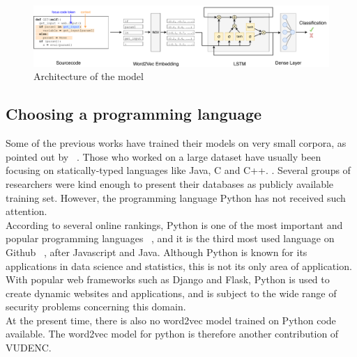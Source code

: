 \documentclass[
	a4paper,
	pagesize,
	pdftex,
	12pt,
	twoside, %
	BCOR=5mm, %
	ngerman,
	fleqn,
	final,
	]{scrartcl}
\begin{document}
\begin{figure}[ht]
	\centering
	\includegraphics[width=\linewidth]{img/Architecture}
	\caption{Architecture of the model}
	\label{fig:architecture}
\end{figure}


\subsection{Choosing a programming language}
Some of the previous works have trained their models on very small corpora, as pointed out by ~\cite{Bhoopchand.2016}. Those who worked on a large dataset have usually been focusing on statically-typed languages like Java, C and C++. \cite{Bellon.2007,Russell.2018,Liu.2018,Dam.2017, Rolim.2018}. Several groups of researchers were kind enough to present their databases as publicly available training set. However, the programming language Python has not received such attention. \\
According to several online rankings, Python is one of the most important and popular programming languages ~\cite{AyeshaCuthbert.15.4.2019, VidushiDwivedi.}, and it is the third most used language on Github ~\cite{Github.com.19}, after Javascript and Java. Although Python is known for its applications in data science and statistics, this is not its only area of application. With popular web frameworks such as Django and Flask, Python is used to create dynamic websites and applications, and is subject to the wide range of security problems concerning this domain.\\
At the present time, there is also no word2vec model trained on Python code available. The word2vec model for python is therefore  another contribution of VUDENC.\\
\end{document}
